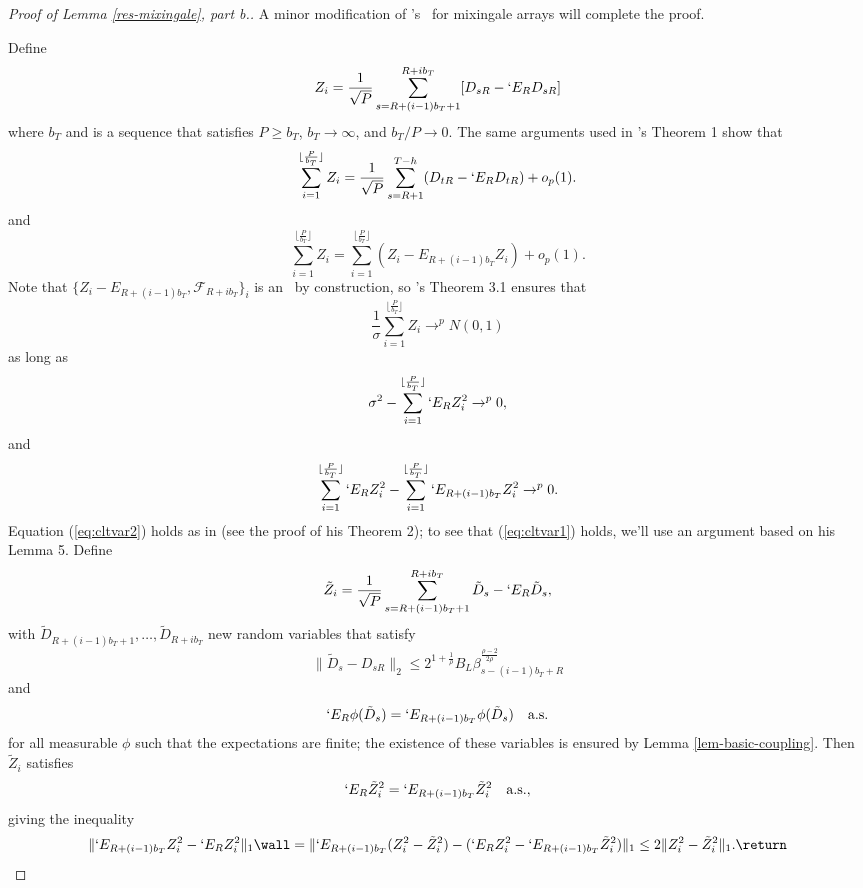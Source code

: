 \documentclass[11pt]{article}
\newcommand{\E}{`E}
\newcommand{\citepos}[1]{\citeauthor{#1}'s \citeyearpar{#1}}
\newcommand{\oosSum}[2]{\ensuremath{\sum_{#1=R+#2}^{T-\h}}}
\newcommand{\h}{h}
\newcommand{\InnerBlockL}[1]{\ensuremath{R+(#1-1)b_T + 1}}
\newcommand{\InnerBlockU}[1]{\ensuremath{R+#1 b_T}}
\newcommand{\OuterBlockU}{\lfloor \frac P{b_T} \rfloor}
\newcommand{\SumOuterBlock}[1]{\ensuremath{\sum_{#1=1}^{\OuterBlockU}}}
\newcommand{\SumInnerBlock}[2]{\ensuremath{\sum_{#1=\InnerBlockL{#2}}^{\InnerBlockU{#2}}}}
\newcommand{\CEOuterBlock}[2]{\ensuremath{\E_{\InnerBlockU{(#2-1)}} #1}}
\newcommand{\ZSummand}{D_{sR} - \E_R D_{sR}}
\newcommand{\ZDef}{ \frac1{\sqrt{P}} \SumInnerBlock{s}{i} [\ZSummand]}
\newcommand{\ZSqCE}{\ensuremath{\CEOuterBlock{Z_i^2}{i}}}
\newcommand{\rhoExp}{\ensuremath{\frac{\rho-2}{2\rho}}}
\begin{document}
\begin{proof}[Proof of Lemma \ref{res-mixingale}, part b.]
  A minor modification of \citepos{de_jong_central_1997} \clt\ for
  mixingale arrays will complete the proof.

Define
\[\label{eq:z1}
  Z_i = \ZDef
\]
where $b_T$ and is a sequence that satisfies $P \geq b_T$,
$b_T\to\infty$, and $b_T/P\to 0$.  The same arguments used in
\citepos{de_jong_central_1997} Theorem 1 show that
\begin{equation*}
   \SumOuterBlock{i} Z_i = \frac1{\sqrt{P}} \oosSum{s}{1} (D_{tR} - \E_R D_{tR}) + o_p(1).
\end{equation*}
and
\begin{equation*}
  \SumOuterBlock{i} Z_i = \SumOuterBlock{i} (Z_i - E_{R + (i-1)b_T}
  Z_i) + o_p(1).
\end{equation*}
Note that $\{Z_i - E_{R + (i-1)b_T},\mathcal{F}_{R + i b_T}\}_i$ is an
\mds\ by construction, so \citepos{hall_martingale_1980} Theorem 3.1
ensures that
\[
\frac1{\sigma} \SumOuterBlock{i} Z_i \to^p
N(0,1)
\]
as long as
\begin{equation}\label{eq:cltvar2}
  \sigma^2 - \SumOuterBlock{i} \E_R Z_i^2 \to^p 0,
\end{equation}
and
\begin{equation}\label{eq:cltvar1}
  \SumOuterBlock{i} \E_R Z_i^2 - \SumOuterBlock{i} \ZSqCE \to^p 0.
\end{equation}
Equation (\ref{eq:cltvar2}) holds as in \citet{de_jong_central_1997}
(see the proof of his Theorem 2); to see that (\ref{eq:cltvar1})
holds, we'll use an argument based on his Lemma 5.  Define
\[
\tilde Z_i = \frac1{\sqrt{P}} \SumInnerBlock{s}{i} \tilde D_s -
\E_R \tilde D_s,
\]
with $\tilde D_{R+(i-1)b_T + 1},\dots,\tilde D_{R+ib_T}$ new random
variables that satisfy
\[
\lVert \tilde D_s - D_{sR} \rVert_2 \leq 2^{1 + \frac1\rho} B_L \beta_{s -
  (i-1)b_T + R}^{\rhoExp}
\]
and
\[
\E_R \phi(\tilde D_s) = \E_{R+(i-1)b_T} \phi(\tilde D_s) \quad \text{a.s.}
\]
for all measurable $\phi$ such that the expectations are finite; the
existence of these variables is ensured by Lemma
\ref{lem-basic-coupling}.  Then $\tilde Z_i$ satisfies
\[
\E_R \tilde Z_i^2 = \CEOuterBlock{\tilde Z_i^2}{i} \quad \text{a.s.},
\]
giving the inequality
\[
\lVert \ZSqCE - \E_R Z_i^2 \rVert_1 \wall= \lVert \CEOuterBlock{(Z_i^2 -
  \tilde Z_i^2)}{i} - (\E_R Z_i^2 - \CEOuterBlock{\tilde Z_i^2}{i})
\rVert_1 \\
\leq 2 \lVert Z_i^2 - \tilde Z_i^2 \rVert_1.
\return
\]


\end{proof}
\end{document}
